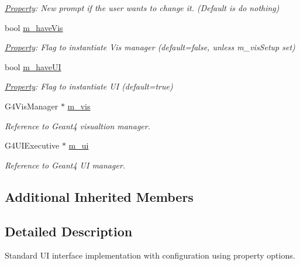 \begin{DoxyCompactItemize}
\begin{DoxyCompactList}\small\item\em \hyperlink{class_d_d4hep_1_1_property}{Property}\+: New prompt if the user wants to change it. (Default is do nothing) \end{DoxyCompactList}\item 
bool \hyperlink{class_d_d4hep_1_1_simulation_1_1_geant4_u_i_manager_ae9d4d2c249167b2fb82ccec43d40000f}{m\+\_\+have\+Vis}
\begin{DoxyCompactList}\small\item\em \hyperlink{class_d_d4hep_1_1_property}{Property}\+: Flag to instantiate Vis manager (default=false, unless m\+\_\+vis\+Setup set) \end{DoxyCompactList}\item 
bool \hyperlink{class_d_d4hep_1_1_simulation_1_1_geant4_u_i_manager_a3045697f75ed358629f23f9716775f29}{m\+\_\+have\+UI}
\begin{DoxyCompactList}\small\item\em \hyperlink{class_d_d4hep_1_1_property}{Property}\+: Flag to instantiate UI (default=true) \end{DoxyCompactList}\item 
G4\+Vis\+Manager $\ast$ \hyperlink{class_d_d4hep_1_1_simulation_1_1_geant4_u_i_manager_a5c333e63d3fb38d0196d075ddac79fff}{m\+\_\+vis}
\begin{DoxyCompactList}\small\item\em Reference to Geant4 visualtion manager. \end{DoxyCompactList}\item 
G4\+U\+I\+Executive $\ast$ \hyperlink{class_d_d4hep_1_1_simulation_1_1_geant4_u_i_manager_aeec06cd94ff75bad4130a535145be277}{m\+\_\+ui}
\begin{DoxyCompactList}\small\item\em Reference to Geant4 UI manager. \end{DoxyCompactList}\end{DoxyCompactItemize}
\subsection*{Additional Inherited Members}


\subsection{Detailed Description}
Standard UI interface implementation with configuration using property options. 

